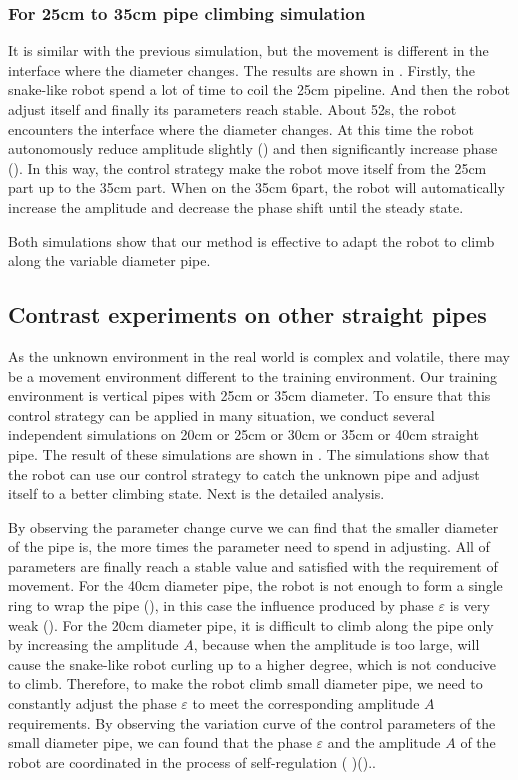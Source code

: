 \subsubsection{For 25cm to 35cm pipe climbing simulation}
It is similar with the previous simulation, but the movement is different in the interface where the diameter changes. The results are shown in . Firstly, the snake-like robot spend a lot of time to coil the 25cm pipeline. And then the robot adjust itself and finally its parameters reach stable. About 52s, the robot encounters the interface where the diameter changes. At this time the robot autonomously reduce amplitude slightly () and then significantly increase  phase (). In this way, the control strategy make the robot move itself from the 25cm part up to the 35cm part. When on the 35cm 6part, the robot will automatically increase the amplitude and decrease the phase shift until the steady state.

Both simulations show that our method is effective to adapt the robot to climb along the variable diameter pipe.

\subsection{Contrast experiments on other straight pipes}

As the unknown environment in the real world is complex and volatile, there may be a movement environment different to the training environment. Our training environment is vertical pipes with 25cm or 35cm diameter. To ensure that this control strategy can be applied in many situation, we conduct several  independent simulations on 20cm or 25cm or 30cm or 35cm or 40cm straight pipe. The result of these simulations are shown in . The simulations show that the robot can use our control strategy to catch the unknown pipe and adjust itself to a better climbing state. Next is the detailed analysis.

By observing the parameter change curve we can find that the smaller diameter of the pipe is, the more times the parameter need to spend in adjusting. All of parameters are finally reach a stable value and satisfied with the requirement of movement. For the 40cm diameter pipe, the robot is not enough to form a single ring to wrap the pipe (), in this case the influence produced by phase $\varepsilon$ is very weak (). For the 20cm diameter pipe, it is difficult to climb along the pipe only by increasing the amplitude $A$, because when the amplitude is too large, will cause the snake-like robot curling up to a higher degree, which is not conducive to climb. Therefore, to make the robot climb small diameter pipe, we need to constantly adjust the phase $\varepsilon$ to meet the corresponding amplitude $A$ requirements. By observing the variation curve of the control parameters of the small diameter pipe, we can found that the phase $\varepsilon$ and the amplitude $A$ of the robot are coordinated in the process of self-regulation ( )()..

